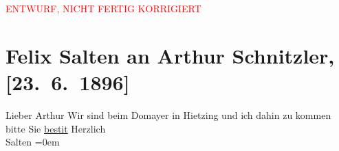 
\begin{center}
            \textcolor{red}{ENTWURF, NICHT FERTIG KORRIGIERT}
                      \end{center}
            
         \renewcommand{\erwaehnteOrte}{Orte: Café Dommayer, Wien, XIII., Hietzing}
         \renewcommand{\erwaehnteWerke}{}
               \section[Felix Salten an Arthur Schnitzler, {[}23. 6. 1896{]}]{ Felix Salten an Arthur Schnitzler, {[}23. 6. 1896{]}}\nopagebreak{}\rehead{ }\begin{ledgroupsized}[t]{13cm}\normalsize\beginnumbering \toendnotes[C]{\smallbreak\pagebreak[2]} 
\pstart{}{\pb}Lieber Arthur\pend\pstart
           Wir sind beim Domayer in Hietzing und ich dahin zu kommen bitte Sie \uline{besti{\geminationm}t}\pend
           \pstart
           Herzlich {\\[\baselineskip]}\spacefill\mbox{Salten}\pend
           \leftskip=0em{}
         
         \endnumbering{}\end{ledgroupsized}\begin{anhang}\end{anhang}\newcommand{\dateiname}{L03173}\newcommand{\titel}{Felix Salten an Arthur Schnitzler, [23. 6. 1896]}\newcommand{\editorInnen}{Martin Anton Müller und Laura Untner}
      
